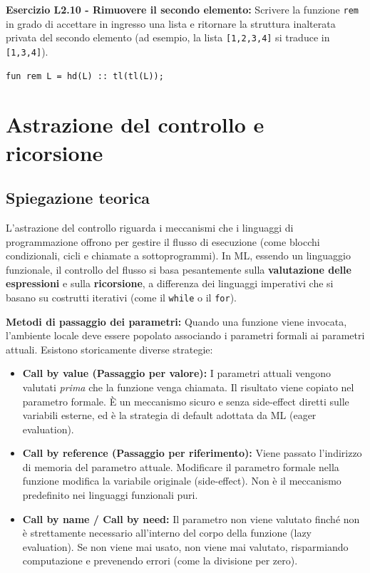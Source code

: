 \documentclass[12pt, a4paper]{article}
\begin{document}
\textbf{Esercizio L2.10 - Rimuovere il secondo elemento:}
Scrivere la funzione \texttt{rem} in grado di accettare in ingresso una lista e ritornare la struttura inalterata privata del secondo elemento (ad esempio, la lista \texttt{[1,2,3,4]} si traduce in \texttt{[1,3,4]}).
\begin{verbatim}
fun rem L = hd(L) :: tl(tl(L));
\end{verbatim}

\section{Astrazione del controllo e ricorsione}

\subsection{Spiegazione teorica}
L'astrazione del controllo riguarda i meccanismi che i linguaggi di programmazione offrono per gestire il flusso di esecuzione (come blocchi condizionali, cicli e chiamate a sottoprogrammi). In ML, essendo un linguaggio funzionale, il controllo del flusso si basa pesantemente sulla \textbf{valutazione delle espressioni} e sulla \textbf{ricorsione}, a differenza dei linguaggi imperativi che si basano su costrutti iterativi (come il \texttt{while} o il \texttt{for}).

\textbf{Metodi di passaggio dei parametri:}
Quando una funzione viene invocata, l'ambiente locale deve essere popolato associando i parametri formali ai parametri attuali. Esistono storicamente diverse strategie:
\begin{itemize}
    \item \textbf{Call by value (Passaggio per valore):} I parametri attuali vengono valutati \textit{prima} che la funzione venga chiamata. Il risultato viene copiato nel parametro formale. È un meccanismo sicuro e senza side-effect diretti sulle variabili esterne, ed è la strategia di default adottata da ML (eager evaluation).
    \item \textbf{Call by reference (Passaggio per riferimento):} Viene passato l'indirizzo di memoria del parametro attuale. Modificare il parametro formale nella funzione modifica la variabile originale (side-effect). Non è il meccanismo predefinito nei linguaggi funzionali puri.
    \item \textbf{Call by name / Call by need:} Il parametro non viene valutato finché non è strettamente necessario all'interno del corpo della funzione (lazy evaluation). Se non viene mai usato, non viene mai valutato, risparmiando computazione e prevenendo errori (come la divisione per zero).
\end{itemize}
\end{document}
